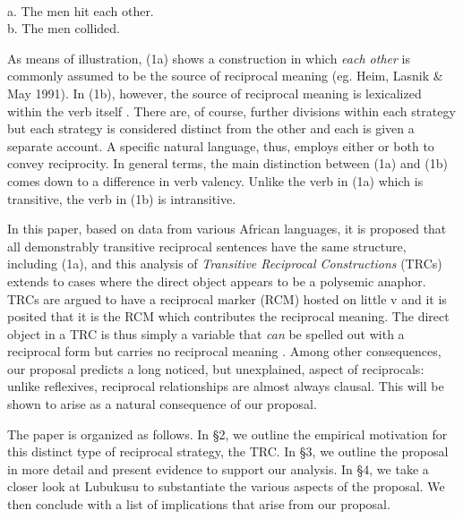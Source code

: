 \documentclass[output=paper]{langsci/langscibook}
\begin{document}
\setcounter{listWWviiiNumxlileveli}{0}
\begin{listWWviiiNumxlileveli}
\item \ea\label{ex:}
\\
\end{listWWviiiNumxlileveli}
\gll   \textup{a.  }The men hit each other.  \\
\gll \textup{b.  }The men collided.\\
\setcounter{listWWviiiNumxixleveli}{0}
\begin{listWWviiiNumxixleveli}
\begin{styleExample}
As means of illustration, (1a) shows a construction in which \textit{each other} is commonly assumed to be the source of reciprocal meaning (eg. Heim, Lasnik \& May 1991). In (1b), however, the source of reciprocal meaning is lexicalized within the verb itself \citep{Siloni2012}.  There are, of course, further divisions within each strategy but each strategy is considered distinct from the other and each is given a separate account. A specific natural language, thus, employs either or both to convey reciprocity. In general terms, the main distinction between (1a) and (1b) comes down to a difference in verb valency. Unlike the verb in (1a) which is transitive, the verb in (1b) is intransitive.
\end{styleExample}

\begin{styleExample}
  In this paper, based on data from various African languages, it is proposed that all demonstrably transitive reciprocal sentences have the same structure, including (1a), and this analysis of \textit{Transitive Reciprocal Constructions} (TRCs) extends to cases where the direct object appears to be a polysemic anaphor. TRCs are argued to have a reciprocal marker (RCM) hosted on little v and it is posited that it is the RCM which contributes the reciprocal meaning. The direct object in a TRC is thus simply a variable that \textit{can} be spelled out with a reciprocal form but carries no reciprocal meaning \citep{Safir2014}. Among other consequences, our proposal predicts a long noticed, but unexplained, aspect of reciprocals: unlike reflexives, reciprocal relationships are almost always clausal. This will be shown to arise as a natural consequence of our proposal.
\end{styleExample}

\begin{styleExample}
  The paper is organized as follows. In §2, we outline the empirical motivation for this distinct type of reciprocal strategy, the TRC. In §3, we outline the proposal in more detail and present evidence to support our analysis. In §4, we take a closer look at Lubukusu to substantiate the various aspects of the proposal. We then conclude with a list of implications that arise from our proposal.
\end{styleExample}
\end{listWWviiiNumxixleveli}
\end{document}
